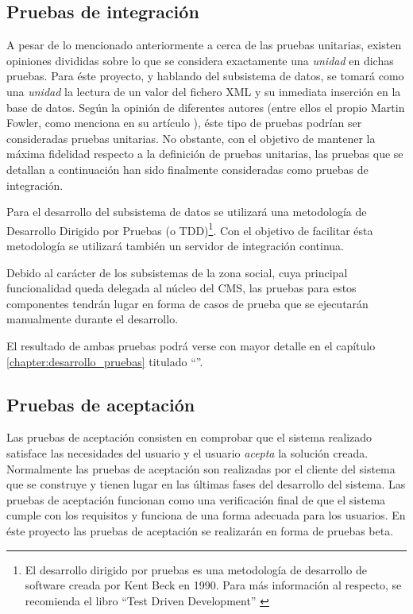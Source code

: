 \subsection{Pruebas de integración}
A pesar de lo mencionado anteriormente a cerca de las pruebas unitarias, existen opiniones divididas sobre lo que se considera exactamente una \textit{unidad} en dichas pruebas.  Para éste proyecto, y hablando del subsistema de datos, se tomará como una \textit{unidad} la lectura de un valor del fichero XML y su inmediata inserción en la base de datos.\newline
Según la opinión de diferentes autores (entre ellos el propio Martin Fowler, como menciona en su artículo \cite{mfowler:unit-testing}), éste tipo de pruebas podrían ser consideradas pruebas unitarias.  No obstante, con el objetivo de mantener la máxima fidelidad respecto a la definición de pruebas unitarias, las pruebas que se detallan a continuación han sido finalmente consideradas como pruebas de integración.

Para el desarrollo del subsistema de datos se utilizará una metodología de Desarrollo Dirigido por Pruebas (o TDD)\footnote{El desarrollo dirigido por pruebas es una metodología de desarrollo de software creada por Kent Beck en 1990.  Para más información al respecto, se recomienda el libro ``Test Driven Development'' \cite{kbeck:test-driven-development}}.  Con el objetivo de facilitar ésta metodología se utilizará también un servidor de integración continua.

Debido al carácter de los subsistemas de la zona social, cuya principal funcionalidad queda delegada al núcleo del CMS, las pruebas para estos componentes tendrán lugar en forma de casos de prueba que se ejecutarán manualmente durante el desarrollo.  

El resultado de ambas pruebas podrá verse con mayor detalle en el capítulo \ref{chapter:desarrollo_pruebas} titulado ``''.


\subsection{Pruebas de aceptación}
Las pruebas de aceptación consisten en comprobar que el sistema realizado satisface las necesidades del usuario y el usuario \textit{acepta} la solución creada.  Normalmente las pruebas de aceptación son realizadas por el cliente del sistema que se construye y tienen lugar en las últimas fases del desarrollo del sistema.  Las pruebas de aceptación funcionan como una verificación final de que el sistema cumple con los requisitos y funciona de una forma adecuada para los usuarios.
En éste proyecto las pruebas de aceptación se realizarán en forma de pruebas beta.

